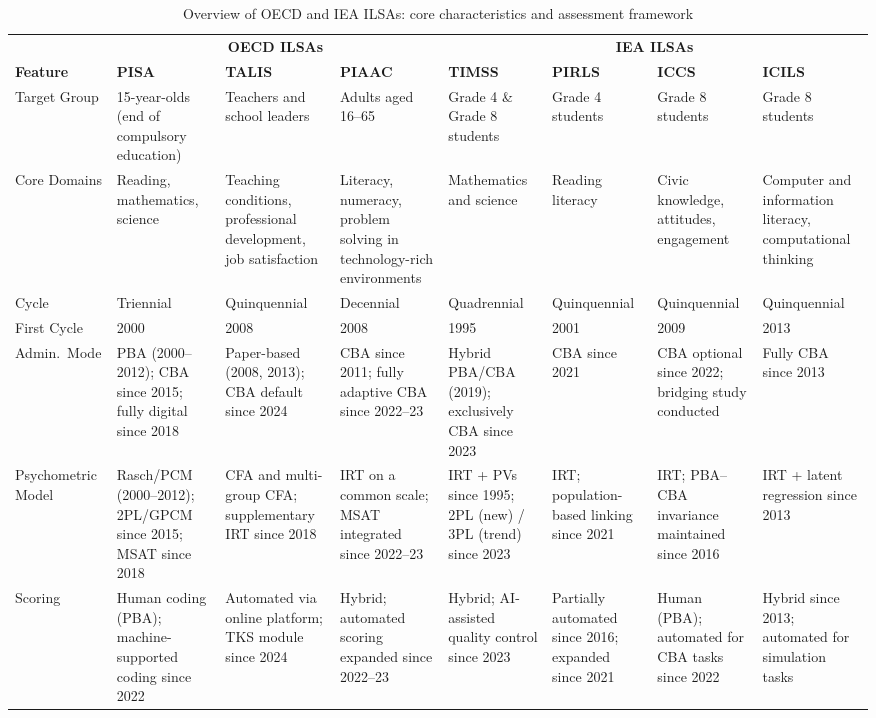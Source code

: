 \documentclass{ieeeaccess}
\begin{document}
\begin{table}
\centering
\small
\caption{Overview of OECD and IEA ILSAs: core characteristics and assessment framework}
\label{tab:ilsa_summary}
\renewcommand{\arraystretch}{1.4}
\setlength{\tabcolsep}{4pt}

\begin{tabular}{p{1.9cm}p{3.0cm}p{3.0cm}p{3.0cm}p{2.6cm}p{2.6cm}p{2.6cm}p{2.6cm}}
\toprule
& \multicolumn{3}{c}{\textbf{OECD ILSAs}} & \multicolumn{4}{c}{\textbf{IEA ILSAs}} \\
\cmidrule(lr){2-4}\cmidrule(lr){5-8}
\textbf{Feature} & \textbf{PISA} & \textbf{TALIS} & \textbf{PIAAC} & \textbf{TIMSS} & \textbf{PIRLS} & \textbf{ICCS} & \textbf{ICILS} \\
\midrule

Target Group
& 15-year-olds (end of compulsory education)
& Teachers and school leaders
& Adults aged 16--65
& Grade 4 \& Grade 8 students
& Grade 4 students
& Grade 8 students
& Grade 8 students \\

Core Domains
& Reading, mathematics, science
& Teaching conditions, professional development, job satisfaction
& Literacy, numeracy, problem solving in technology-rich environments
& Mathematics and science
& Reading literacy
& Civic knowledge, attitudes, engagement
& Computer and information literacy, computational thinking \\

Cycle
& Triennial
& Quinquennial
& Decennial
& Quadrennial
& Quinquennial
& Quinquennial
& Quinquennial \\

First Cycle
& 2000 & 2008 & 2008 & 1995 & 2001 & 2009 & 2013 \\

Admin.\ Mode
& PBA (2000--2012); CBA since 2015; fully digital since 2018
& Paper-based (2008, 2013); CBA default since 2024
& CBA since 2011; fully adaptive CBA since 2022--23
& Hybrid PBA/CBA (2019); exclusively CBA since 2023
& CBA since 2021
& CBA optional since 2022; bridging study conducted
& Fully CBA since 2013 \\

Psychometric Model
& Rasch/PCM (2000--2012); 2PL/GPCM since 2015; MSAT since 2018
& CFA and multi-group CFA; supplementary IRT since 2018
& IRT on a common scale; MSAT integrated since 2022--23
& IRT + PVs since 1995; 2PL (new) / 3PL (trend) since 2023
& IRT; population-based linking since 2021
& IRT; PBA--CBA invariance maintained since 2016
& IRT + latent regression since 2013 \\

Scoring
& Human coding (PBA); machine-supported coding since 2022
& Automated via online platform; TKS module since 2024
& Hybrid; automated scoring expanded since 2022--23
& Hybrid; AI-assisted quality control since 2023
& Partially automated since 2016; expanded since 2021
& Human (PBA); automated for CBA tasks since 2022
& Hybrid since 2013; automated for simulation tasks \\

\bottomrule
\end{tabular}
\end{table}
\end{document}
